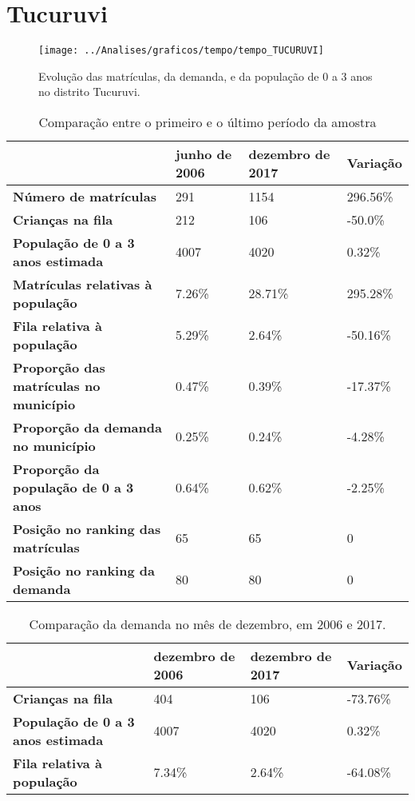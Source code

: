 \section{Tucuruvi}
\begin{figure}[H]
\centering
\texttt{[image: ../Analises/graficos/tempo/tempo\_TUCURUVI]}
\caption{Evolução das matrículas, da demanda, e da população de 0 a 3 anos no distrito Tucuruvi.}
\end{figure}
\begin{table}[H]
\begin{tabular}{|l|l|l|l|}
\hline
\textbf{}                                      & \textbf{junho de 2006}       & \textbf{dezembro de 2017}    & \textbf{Variação} \\ \hline
\textbf{Número de matrículas}                  & 291 & 1154 & 296.56\% \\ \hline
\textbf{Crianças na fila}                      & 212 & 106 & -50.0\% \\ \hline
\textbf{População de 0 a 3 anos estimada}      & 4007 & 4020 & 0.32\% \\ \hline
\textbf{Matrículas relativas à população}      & 7.26\% & 28.71\% & 295.28\% \\ \hline
\textbf{Fila relativa à população}             & 5.29\% & 2.64\% & -50.16\% \\ \hline
\textbf{Proporção das matrículas no município} & 0.47\% & 0.39\% & -17.37\% \\ \hline
\textbf{Proporção da demanda no município}     & 0.25\% & 0.24\% & -4.28\% \\ \hline
\textbf{Proporção da população de 0 a 3 anos}  & 0.64\% & 0.62\% & -2.25\% \\ \hline
\textbf{Posição no ranking das matrículas}     & 65 & 65 & 0 \\ \hline
\textbf{Posição no ranking da demanda}         & 80 & 80 & 0 \\ \hline
\end{tabular}
\caption{Comparação entre o primeiro e o último período da amostra}
\end{table}
\begin{table}[H]
\begin{tabular}{|l|l|l|l|}
\hline
\textbf{}                                 & \textbf{dezembro de 2006} & \textbf{dezembro de 2017} & \textbf{Variação} \\ \hline
\textbf{Crianças na fila}                      & 404 & 106 & -73.76\% \\ \hline
\textbf{População de 0 a 3 anos estimada}      & 4007 & 4020 & 0.32\% \\ \hline
\textbf{Fila relativa à população}             & 7.34\% & 2.64\% & -64.08\% \\ \hline
\end{tabular}
\caption{Comparação da demanda no mês de dezembro, em 2006 e 2017.}
\end{table}
